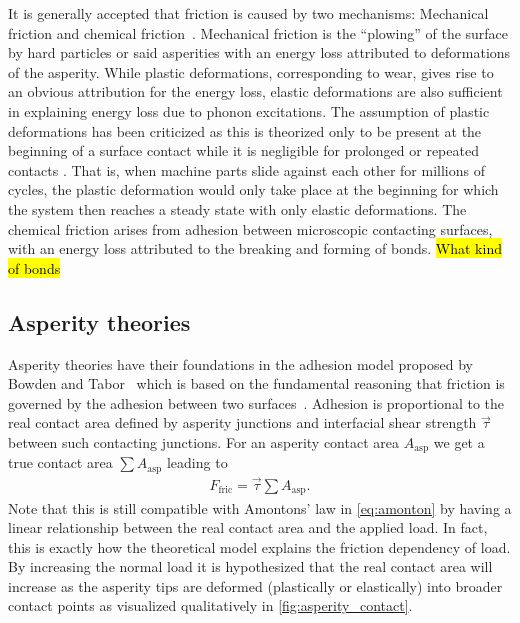 It is generally accepted that friction is caused by two mechanisms: Mechanical
friction and chemical friction~\cite{kim_nano-scale_2009}. Mechanical
friction is the ``plowing'' of the surface by hard particles or said asperities
with an energy loss attributed to deformations of the asperity. While plastic
deformations, corresponding to wear, gives rise to an obvious attribution for
the energy loss, elastic deformations are also sufficient in explaining energy
loss due to phonon excitations. The assumption of plastic deformations
has been criticized as this is theorized only to be present at the beginning of
a surface contact while it is negligible for prolonged or repeated contacts
\cite{CARBONE20082555}. That is, when machine parts slide against each other for
millions of cycles, the plastic deformation would only take place at the beginning for which the system then reaches a steady state with only elastic deformations.
The chemical friction arises from adhesion between microscopic contacting
surfaces, with an energy loss attributed to the breaking and forming of bonds. \hl{What kind of bonds} 



\subsection{Asperity theories} %

Asperity theories have their foundations in the adhesion model proposed by Bowden and Tabor~\cite{bowden2001friction} which is based on the fundamental reasoning that friction is governed by the adhesion between two surfaces~\cite{Kim_2012}. Adhesion is proportional to the real contact area defined by asperity junctions and interfacial shear strength $\vec{\tau}$ between such contacting junctions. For an asperity contact area $A_{\text{asp}}$ we get a true contact area $\sum A_{\text{asp}}$ leading to 
\begin{align*}
  F_\text{fric} = \vec{\tau} \sum A_{\text{asp}}.
\end{align*}
Note that this is still compatible with Amontons’ law in \cref{eq:amonton} by having a linear relationship between the real contact area and the
applied load. In fact, this is exactly how the theoretical model explains the friction dependency of load. By increasing the normal load it is hypothesized that the real contact area will increase as the asperity tips are deformed (plastically or elastically) into broader contact points as visualized qualitatively in \cref{fig:asperity_contact}.

